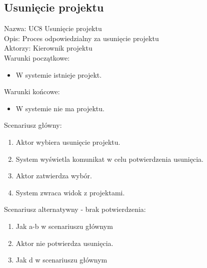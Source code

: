 \subsection{Usunięcie projektu}
Nazwa: UC8 Usunięcie projektu\\
Opis: Proces odpowiedzialny za usunięcie projektu\\
Aktorzy: Kierownik projektu \\
Warunki początkowe:
\begin{itemize}
\item W systemie istnieje projekt.
\end{itemize}
Warunki końcowe:
\begin{itemize}
\item W systemie nie ma projektu.
\end{itemize}
Scenariusz główny:
\begin{enumerate}
\item Aktor wybiera usunięcie projektu.
\item System wyświetla komunikat w celu potwierdzenia usunięcia.
\item Aktor zatwierdza wybór.
\item System zwraca widok z projektami.
\end{enumerate}
Scenariusz alternatywny - brak potwierdzenia: 
\begin{enumerate}
\item Jak a-b w scenariuszu głównym
\item Aktor nie potwierdza usunięcia.
\item Jak d w scenariuszu głównym
\end{enumerate}


